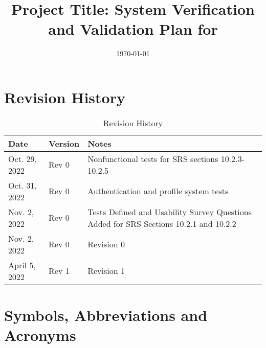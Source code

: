 \documentclass[12pt, titlepage]{article}
\begin{document}
\title{Project Title: System Verification and Validation Plan for \progname{}} 
\author{\authname}
\date{\today}
	
\maketitle


\section*{Revision History}

\begin{table}[hp]
    \begin{tabularx}{\textwidth}{p{3cm}p{2cm}X}
        \toprule {\bf Date} & {\bf Version} & {\bf Notes}\\
        \midrule
        Oct. 29, 2022 & Rev 0 & Nonfunctional tests for SRS sections 10.2.3-10.2.5\\
        Oct. 31, 2022 & Rev 0 & Authentication and profile system tests\\
        Nov. 2, 2022  & Rev 0 & Tests Defined and Usability Survey Questions Added for SRS Sections 10.2.1 and 10.2.2\\
        Nov. 2, 2022  & Rev 0 & Revision 0\\
        April 5, 2022 & Rev 1 & Revision 1\\
        \bottomrule
    \end{tabularx}
    \caption{Revision History}
\end{table}

\newpage

\tableofcontents

\listoftables

\newpage

\section{Symbols, Abbreviations and Acronyms}
\end{document}
